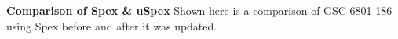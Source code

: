 {\bf Comparison of Spex \& uSpex} Shown here is a comparison of GSC 6801-186 using Spex before and after it was updated. \label{fig:uSpex-Spex}